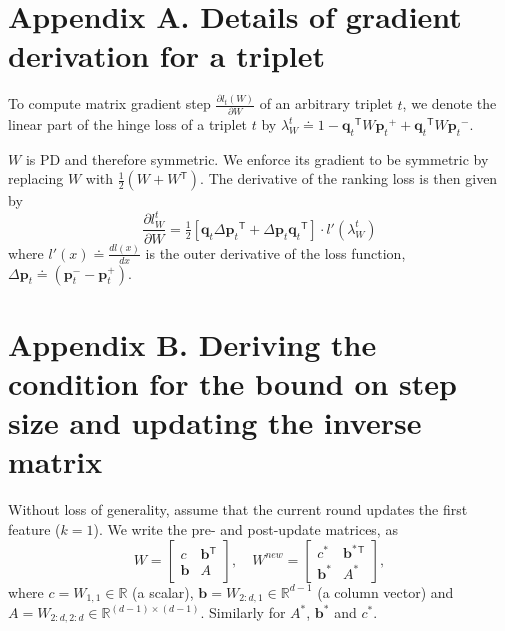\documentclass[twoside,11pt]{article}
\newcommand\mat[1]{{#1}}
\renewcommand\vec[1]{\mathbf{#1}}
\newcommand{\T}{{}^\mathsf{T}}
\newcommand{\W}{\mat{W}}
\newcommand{\newW}{{\mat{W^{new}}}}
\newcommand{\eqdef}{\doteq}
\newcommand{\R}{\mathbb{R}}
\newcommand{\q}{{\vec{q}}}
\newcommand{\p}{{\vec{p}}}
\newcommand{\trip}{{t}}
\newcommand{\qt}{{\q_{\trip}}}
\newcommand{\pt}{{\p_{\trip}}}
\newcommand{\B}{\vec{b}}
\newcommand{\C}{c}
\newcommand{\Wvec}{\W_{2:d,1}}
\newcommand{\Wscalar}{\W_{1,1}}
\begin{document}

\newpage

\appendix
\section*{Appendix A. Details of gradient derivation for a triplet}
\label{appendix-grad}

To compute matrix gradient step $\frac{\partial {l_t (\W)}}{\partial \W}$ of an arbitrary triplet $t$, we denote the linear part of the hinge loss of a triplet $t$ by $\lambda_{W}^t \eqdef 
1-\qt\T \W \pt^{+} + \qt\T\W\pt^{-}.$

$\W$ is PD and therefore symmetric. We enforce its gradient to be symmetric by replacing $\W$ with $\tfrac{1}{2}(\W + \W\T)$.
The derivative of the ranking loss is then given by
\begin{equation}
\frac{\partial {l_{\W}^{t}}}{\partial \W} = \tfrac{1}{2}[\vec{q}_{t}\Delta\vec{p}_{t}\T  + \Delta\vec{p}_{t}\vec{q}_{t}\T]\cdot {l'}(\lambda_{W}^t)
\label{dlossranking}
\nonumber 
\end{equation} where $l'(x) \eqdef \frac{d{l(x)}}{dx}$ is the outer derivative of the loss function, $\Delta\vec{p}_{t} \eqdef (\vec{p}_{t}^{-} - \vec{p}_{t}^{+})$.

\section*{Appendix B. Deriving the condition for the bound on step size and updating the inverse matrix}
\label{appendix-inverse}

Without loss of generality, assume that the current round updates the first feature ($k = 1$). We write the pre- and post-update
matrices, as
\begin{equation}
  \W = \left[ \begin{matrix} \C & \B\T \\ \B & A \end{matrix} \right],
  \quad
  \newW = \left[ \begin{matrix} \C^* & \B^*\T \\ \B^* & A^* \end{matrix} \right],
  \label{schurNotationPreUpdate}
\end{equation}
 where $\C = \Wscalar \in \R$ (a scalar), $\B = \Wvec \in
\R^{d-1}$ (a column vector) and $A = \W_{2:d,2:d} \in \R^{(d-1)
\times (d-1)}$. Similarly for $A^*$, $\B^*$ and $\C^*$.
\end{document}
